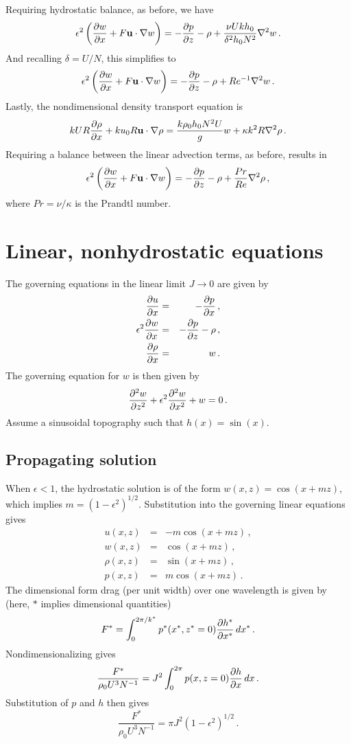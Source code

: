 \documentclass[12pt]{article}
\begin{document}
Requiring hydrostatic balance, as before, we have
\[
\epsilon^2 \left(\frac{\partial{w}}{\partial{x}} + F\mathbf{u}\cdot\nabla w\right) = -\frac{\partial{p}}{\partial{z}} - \rho + \frac{\nu U k h_0 }{\delta^2 h_0 N^2}\nabla^2 w\,.
\]
And recalling $\delta = U/N$, this simplifies to 
\[
\epsilon^2 \left(\frac{\partial{w}}{\partial{x}} + F\mathbf{u}\cdot\nabla w\right) = -\frac{\partial{p}}{\partial{z}} - \rho + Re^{-1}\nabla^2 w\,.
\]
Lastly, the nondimensional density transport equation is
\[
k U R \frac{\partial{\rho}}{\partial{x}} + k u_0 R \mathbf{u}\cdot\nabla\rho = \frac{k \rho_0 h_0 N^2 U}{g} w + \kappa k^2 R \nabla^2 \rho\,.
\]
Requiring a balance between the linear advection terms, as before, results in
\[
\epsilon^2 \left(\frac{\partial{w}}{\partial{x}} + F\mathbf{u}\cdot\nabla w\right) = -\frac{\partial{p}}{\partial{z}} - \rho + \frac{Pr}{Re}\nabla^2 \rho\,,
\]
where $Pr=\nu/\kappa$ is the Prandtl number.
\section{Linear, nonhydrostatic equations}
The governing equations in the linear limit $J\to 0$ are given by
\begin{eqnarray*}
\frac{\partial{u}}{\partial{x}} &=& -\frac{\partial{p}}{\partial{x}}\,,\\
\epsilon^2 \frac{\partial{w}}{\partial{x}} &=& -\frac{\partial{p}}{\partial{z}} - \rho\,,\\
\frac{\partial{\rho}}{\partial{x}} &=& w\,.
\end{eqnarray*}
The governing equation for $w$ is then given by
\[ 
\frac{\partial^{2}{w}}{\partial{z}^{2}} + \epsilon^2 \frac{\partial^{2}{w}}{\partial{x}^{2}} + w = 0\,.
\]
Assume a sinusoidal topography such that $h(x) = \sin(x)$.

\subsection{Propagating solution}

When $\epsilon<1$, the hydrostatic solution is of the form
$w(x,z) = \cos(x + m z)$, which implies $m = (1-\epsilon^2)^{1/2}$.  Substitution into
the governing linear equations gives
\begin{eqnarray*}
u(x,z) &=& -m \cos(x + m z)\,,\\
w(x,z) &=& \cos(x + m z)\,,\\
\rho(x,z) &=& \sin(x + m z)\,,\\
p(x,z) &=& m \cos(x + m z)\,.
\end{eqnarray*}
The dimensional form drag (per unit width) over one wavelength is given by (here, $*$ implies dimensional
quantities)
\[
F^* = \int_{0}^{2\pi/k^*} p^*(x^*,z^*=0)\frac{\partial{h^*}}{\partial{x^*}}\, dx^*\,.
\]
Nondimensionalizing gives
\[
\frac{F^*}{\rho_0 U^3 N^{-1}} = J^2 \int_{0}^{2\pi} p(x,z=0)\frac{\partial{h}}{\partial{x}}\, dx\,.
\]
Substitution of $p$ and $h$ then gives
\[
\frac{F^*}{\rho_0 U^3 N^{-1}} = \pi J^2\left(1 - \epsilon^2\right)^{1/2}\,.
\]
\end{document}

